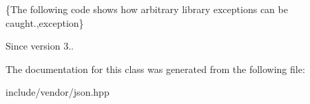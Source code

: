 \{The following code shows how arbitrary library exceptions can be caught.,exception\}

\begin{DoxySince}{Since}
version 3.. 
\end{DoxySince}


The documentation for this class was generated from the following file\+:\begin{DoxyCompactItemize}
\item 
include/vendor/json.\+hpp\end{DoxyCompactItemize}
